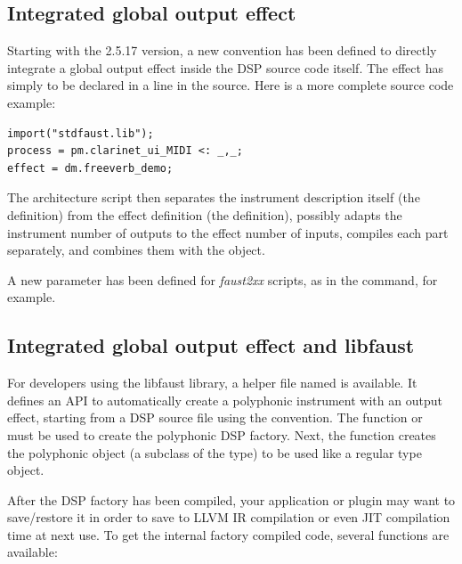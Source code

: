 \subsection{Integrated global output effect}

Starting with the 2.5.17 version, a new convention has been defined to directly integrate a global output effect inside the DSP source code itself. The effect has simply to be declared in a  line in the source. Here is a more complete source code example:

\begin{lstlisting}
import("stdfaust.lib");
process = pm.clarinet_ui_MIDI <: _,_;
effect = dm.freeverb_demo;
\end{lstlisting}

The architecture script then separates the instrument description itself (the  definition) from the effect definition (the   definition), possibly adapts the instrument number of outputs to the effect number of inputs, compiles each part separately, and combines them with the  object.

A new  parameter has been defined for {\it faust2xx} scripts, as in the  command, for example.

\subsection{Integrated global output effect and libfaust}

For developers using the libfaust library, a helper file named  is available. It defines an API to automatically create a polyphonic instrument with an output effect, starting from a DSP source file using the   convention. The function  or  \\  must be used to create the polyphonic DSP factory. Next, the  function creates the polyphonic object (a subclass of the  type) to be used like a regular  type object. 

After the DSP factory has been compiled, your application or plugin may want to save/restore it in order to save \faust to LLVM IR compilation or even JIT compilation time at next use. To get the internal factory compiled code, several functions are available:

